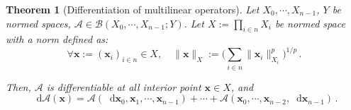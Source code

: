 \documentclass[openany]{book}
\theoremstyle{plain}
\newtheorem{theorem}{Theorem}[section] %
\theoremstyle{definition}
\newcommand{\dif}{\mathop{}\!\mathrm{d}} %
\newcommand*{\bv}{\boldsymbol} %
\begin{document}
\begin{theorem}[Differentiation of multilinear operators]
	\label{theorem: differentiation of multilinear operators}
	Let $X_0, \cdots, X_{n - 1}$, $Y$ be normed spaces, $\mathscr A \in \mathcal B(X_0, \cdots, X_{n - 1}; Y)$. 
	Let $X := \prod_{i \in n} X_i$ be normed space with a norm defined as:
	\begin{equation}\label{equation: norm of product space}
		\forall \bv x := (\bv x_i)_{i \in n} \in X, \quad
		\|\bv x\|_X := \Big( \sum_{i \in n} \|\bv x_i\|_{X_i}^p \Big)^{1/p}\,.
	\end{equation}

	Then, $\mathscr A$ is differentiable at all interior point $\bv x \in X$, and
	\begin{equation*}
		\dif \mathscr A (\bv x) = \mathscr A(\dif \bv x_0, \bv x_1, \cdots, \bv x_{n - 1}) + \cdots + \mathscr A(\bv x_0, \cdots, \bv x_{n-2}, \dif \bv x_{n-1})\,.
	\end{equation*}
\end{theorem}
\end{document}
